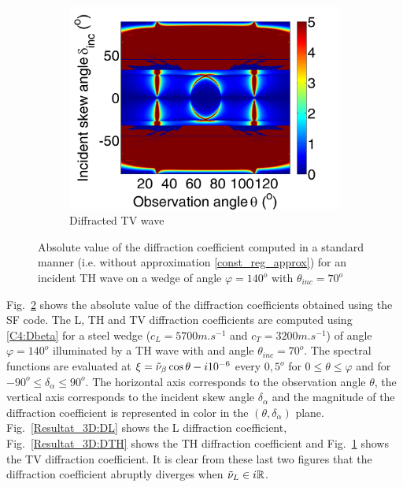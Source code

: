 \begin{figure}[h]
\begin{subfigure}[b]{0.32\textwidth}
        \includegraphics[width=\textwidth]{images/chapter4/Resultats_3D/XpropTV_140_70_TH.png}
        \caption{Diffracted TV wave}
        \label{Resultat_3D:DTV}
    \end{subfigure} 
\caption{Absolute value of the diffraction coefficient computed in a standard manner (i.e. without approximation \eqref{const_reg_approx}) for an incident TH wave on a wedge of angle $\varphi=140^o$ with $\theta_{inc}=70^o$}
\label{Resultat_3D:D}
\end{figure}

Fig.~\ref{Resultat_3D:D} shows the absolute value of the diffraction coefficients obtained using the SF code. The L, TH and TV diffraction coefficients are computed using \eqref{C4:Dbeta} for a steel wedge ($c_L=5700m.s^{-1}$ and $c_T=3200m.s^{-1}$) of angle $\varphi=140^o$ illuminated by a TH wave with and angle $\theta_{inc}=70^o$. The spectral functions are evaluated at $\xi=\tilde{\nu}_{\beta}\cos\theta -i10^{-6}$ every $0,5^o$ for $0\leq\theta\leq \varphi$ and for $-90^o\leq \delta_{\alpha} \leq 90^o$. The horizontal axis corresponds to the observation angle $\theta$, the vertical axis corresponds to the incident skew angle $\delta_{\alpha}$ and the magnitude of the diffraction coefficient is represented in color in the $(\theta,\delta_{\alpha})$ plane. Fig.~\ref{Resultat_3D:DL} shows the L diffraction coefficient, Fig.~\ref{Resultat_3D:DTH} shows the TH diffraction coefficient and Fig.~\ref{Resultat_3D:DTV} shows the TV diffraction coefficient. It is clear from these last two figures that the diffraction coefficient abruptly diverges when $\tilde{\nu}_L \in i\mathbb{R}$.

